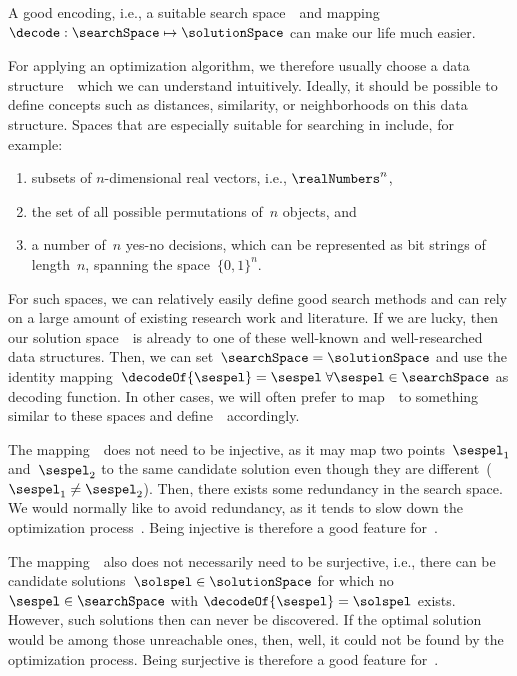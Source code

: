 A good encoding, i.e., a suitable search space~\searchSpace\ and mapping~$\decode:\searchSpace\mapsto\solutionSpace$ can make our life much easier.

For applying an optimization algorithm, we therefore usually choose a data structure~\searchSpace\ which we can understand intuitively.
Ideally, it should be possible to define concepts such as distances, similarity, or neighborhoods on this data structure.
Spaces that are especially suitable for searching in include, for example:%
%
\begin{enumerate}%
%
\item subsets of $n$\nobreakdash-dimensional real vectors, i.e., $\realNumbers^n$,%
%
\item the set of all possible permutations of~$n$ objects, and%
%
\item a number of~$n$ yes-no decisions, which can be represented as bit strings of length~$n$, spanning the space~$\{0,1\}^n$.%
%
\end{enumerate}%
%
For such spaces, we can relatively easily define good search methods and can rely on a large amount of existing research work and literature.
If we are lucky, then our solution space~\solutionSpace\ is already  to one of these well-known and well-researched data structures.
Then, we can set~$\searchSpace=\solutionSpace$ and use the identity mapping~$\decodeOf{\sespel}=\sespel\;\forall \sespel\in\searchSpace$ as decoding function.
In other cases, we will often prefer to map~\solutionSpace\ to something similar to these spaces and define~\decode\ accordingly.

The mapping~\decode\ does not need to be injective, as it may map two points~$\sespel_1$ and~$\sespel_2$ to the same candidate solution even though they are different~($\sespel_1\neq\sespel_2$).
Then, there exists some redundancy in the search space.
We would normally like to avoid redundancy, as it tends to slow down the optimization process~\cite{KW2002OTUOREIMBES}.
Being injective is therefore a good feature for~\decode.

The mapping~\decode\ also does not necessarily need to be surjective, i.e., there can be candidate solutions~$\solspel\in\solutionSpace$ for which no~$\sespel\in\searchSpace$ with $\decodeOf{\sespel}=\solspel$ exists.
However, such solutions then can never be discovered.
If the optimal solution would be among those unreachable ones, then, well, it could not be found by the optimization process.
Being surjective is therefore a good feature for~\decode.

